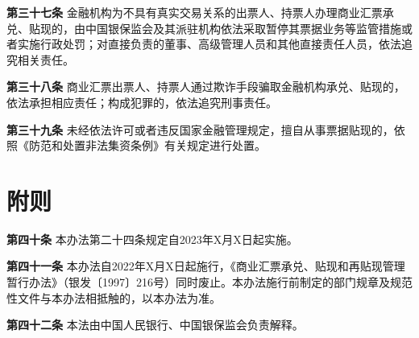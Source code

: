 {\bf 第三十七条} 金融机构为不具有真实交易关系的出票人、持票人办理商业汇票承兑、贴现的，由中国银保监会及其派驻机构依法采取暂停其票据业务等监管措施或者实施行政处罚；对直接负责的董事、高级管理人员和其他直接责任人员，依法追究相关责任。

{\bf 第三十八条} 商业汇票出票人、持票人通过欺诈手段骗取金融机构承兑、贴现的，依法承担相应责任；构成犯罪的，依法追究刑事责任。

{\bf 第三十九条} 未经依法许可或者违反国家金融管理规定，擅自从事票据贴现的，依照《防范和处置非法集资条例》有关规定进行处置。

\section{附则}

{\bf 第四十条} 本办法第二十四条规定自2023年X月X日起实施。

{\bf 第四十一条} 本办法自2022年X月X日起施行，《商业汇票承兑、贴现和再贴现管理暂行办法》（银发〔1997〕216号）同时废止。本办法施行前制定的部门规章及规范性文件与本办法相抵触的，以本办法为准。

{\bf 第四十二条} 本法由中国人民银行、中国银保监会负责解释。

